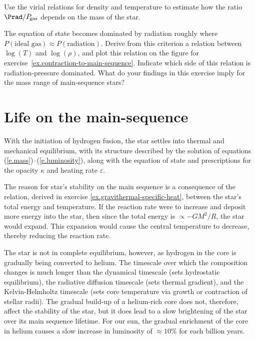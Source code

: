 \begin{exercisebox}
Use the virial relations for density and temperature to estimate how the ratio $\Prad/P_{\!\mathrm{gas}}$ depends on the mass of the star.
\end{exercisebox}

\begin{exercisebox}
\label{ex.maximum-stellar-mass}
The equation of state becomes dominated by radiation roughly where $P(\textrm{ideal gas}) \approx P(\textrm{radiation})$. Derive from this criterion a relation between $\log(T)$ and $\log(\rho)$, and plot this relation on the figure for exercise~\ref{ex.contraction-to-main-sequence}. Indicate which side of this relation is radiation-pressure dominated. What do your findings in this exercise imply for the mass range of main-sequence stars?
\end{exercisebox}

\section{Life on the main-sequence}

With the initiation of hydrogen fusion, the star settles into thermal and mechanical equilibrium, with its structure described by the solution of equations (\ref{e.mass})--(\ref{e.luminosity}), along with the equation of state and prescriptions for the opacity $\kappa$ and heating rate $\varepsilon$. 

The reason for star's stability on the main sequence is a consequence of the relation, derived in exercise \ref{ex.gravithermal-specific-heat}, between the star's total energy and temperature. If the reaction rate were to increase and deposit more energy into the star, then since the total energy is $\propto -GM^{2}/R$, the star would expand. This expansion would cause the central temperature to decrease, thereby reducing the reaction rate.

The star is not in complete equilibrium, however, as hydrogen in the core is gradually being converted to helium. The timescale over which the composition changes is much longer than the dynamical timescale (sets hydrostatic equilibrium), the radiative diffusion timescale (sets thermal gradient), and the Kelvin-Helmholtz timescale (sets core temperature via growth or contraction of stellar radii). The gradual build-up of a helium-rich core does not, therefore, affect the stability of the star, but it does lead to a slow brightening of the star over its main sequence lifetime. For our sun, the gradual enrichment of the core in helium causes a slow increase in luminosity of $\approx10\%$ for each billion years. 

